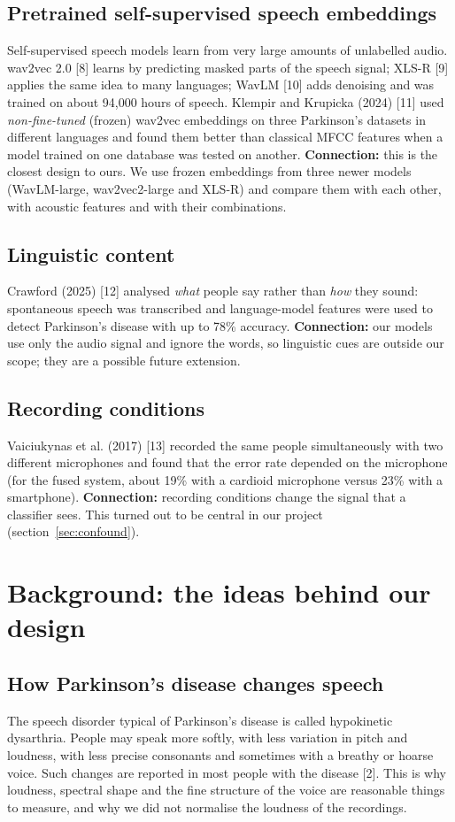 \documentclass[11pt,a4paper]{article}
\begin{document}
\subsection{Pretrained self-supervised speech embeddings}
Self-supervised speech models learn from very large amounts of unlabelled audio. wav2vec 2.0 [8] learns by predicting masked parts of the speech signal; XLS-R [9] applies the same idea to many languages; WavLM [10] adds denoising and was trained on about 94,000 hours of speech. Klempir and Krupicka (2024) [11] used \emph{non-fine-tuned} (frozen) wav2vec embeddings on three Parkinson's datasets in different languages and found them better than classical MFCC features when a model trained on one database was tested on another. \textbf{Connection:} this is the closest design to ours. We use frozen embeddings from three newer models (WavLM-large, wav2vec2-large and XLS-R) and compare them with each other, with acoustic features and with their combinations.

\subsection{Linguistic content}
Crawford (2025) [12] analysed \emph{what} people say rather than \emph{how} they sound: spontaneous speech was transcribed and language-model features were used to detect Parkinson's disease with up to 78\% accuracy. \textbf{Connection:} our models use only the audio signal and ignore the words, so linguistic cues are outside our scope; they are a possible future extension.

\subsection{Recording conditions}
Vaiciukynas et al. (2017) [13] recorded the same people simultaneously with two different microphones and found that the error rate depended on the microphone (for the fused system, about 19\% with a cardioid microphone versus 23\% with a smartphone). \textbf{Connection:} recording conditions change the signal that a classifier sees. This turned out to be central in our project (section~\ref{sec:confound}).

\section{Background: the ideas behind our design}\label{sec:background}
\subsection{How Parkinson's disease changes speech}
The speech disorder typical of Parkinson's disease is called hypokinetic dysarthria. People may speak more softly, with less variation in pitch and loudness, with less precise consonants and sometimes with a breathy or hoarse voice. Such changes are reported in most people with the disease [2]. This is why loudness, spectral shape and the fine structure of the voice are reasonable things to measure, and why we did not normalise the loudness of the recordings.
\end{document}
